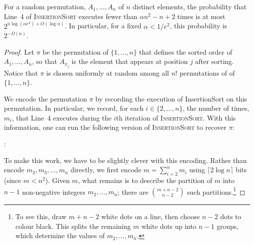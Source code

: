 \documentclass{patmorin}
\begin{document}
\begin{thm}
  For a random permutation, $A_1,\ldots,A_n$ of $n$ distinct elements,
  the probability that Line~4 of \textsc{InsertionSort} executes fewer
  than $\alpha n^2 - n + 2$ times is at most $2^{n\log(\alpha e^2)+O(\log
  n)}$.  In particular, for a fixed $\alpha < 1/e^2$, this probability
  is $2^{-\Omega(n)}$.
\end{thm}

\begin{proof}
  Let $\pi$ be the permutation of $\{1,\ldots,n\}$ that defines the sorted
  order of $A_1,\ldots,A_n$, so that $A_{\pi_j}$ is the element that appears
  at position $j$ after sorting. Notice that $\pi$ is chosen uniformly at
  random among all $n!$ permutations of of $\{1,\ldots,n\}$.
  
  We encode the permutation $\pi$ by recording the execution of
  InsertionSort on this permutation. In particular, we record, for each
  $i\in\{2,\ldots,n\}$, the number of times, $m_i$, that Line~4 executes
  during the $i$th iteration of \textsc{InsertionSort}. With this information,
  one can run the following version of \textsc{InsertionSort} to recover $\pi$:
  
  :
  \begin{algorithmic}[1]
       \ENDFOR
    \ENDFOR
  \end{algorithmic}
   
  To make this work, we have to be slightly clever with this
  encoding. Rather than encode $m_2,m_3,\ldots,m_n$ directly, we first
  encode $m=\sum_{i=2}^{n} m_i$ using $\lceil 2\log n\rceil$ bits (since $m < n^2$). Given $m$, what
  remains is to describe the partition of $m$ into $n-1$ non-negative
  integers $m_2,\ldots,m_n$; there are $\binom{m+n-2}{n-2}$ such
  partitions.\footnote{To see this, draw $m+n-2$ white dots on a line,
  then choose $n-2$ dots to colour black. This splits the remaining $m$ white dots
  up into $n-1$ groups, which determine the values of $m_2,\ldots,m_n$.}
  

\end{proof}
\end{document}
